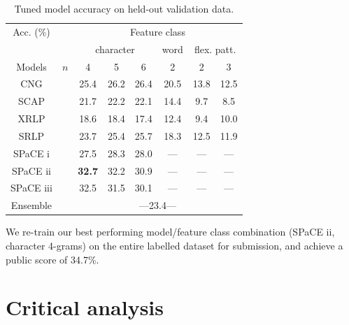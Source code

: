 \documentclass[twocolumn,10pt]{article}
\begin{document}
\begin{table}[h]
\centering
\begin{tabular}{@{}cccccccc@{}}
\cmidrule{3-8}
Acc. (\%)   &     & \multicolumn{6}{c}{Feature class}                    \\
\cmidrule{3-8} 
            &     & \multicolumn{3}{c}{character} & word  & \multicolumn{2}{c}{flex. patt.} \\
\cmidrule(r){1-1} \cmidrule(rl){3-5} \cmidrule(rl){6-6} \cmidrule(rl){7-8} 
Models      & $n$ & 4      & 5      & 6           & 2     & 2     & 3    \\
\cmidrule(r){1-1} \cmidrule{3-8} 
CNG         &     & 25.4   & 26.2   & 26.4        & 20.5  & 13.8  & 12.5 \\
SCAP        &     & 21.7   & 22.2   & 22.1        & 14.4  &  9.7  &  8.5 \\
XRLP        &     & 18.6   & 18.4   & 17.4        & 12.4  &  9.4  & 10.0 \\
SRLP        &     & 23.7   & 25.4   & 25.7        & 18.3  & 12.5  & 11.9 \\
SPaCE i     &     & 27.5   & 28.3   & 28.0        & ---   & ---   & ---  \\
SPaCE ii    & &{\bf 32.7}  & 32.2   & 30.9        & ---   & ---   & ---  \\
SPaCE iii   &     & 32.5   & 31.5   & 30.1        & ---   & ---   & ---  \\
                  \cmidrule{3-8} 
Ensemble    &     & \multicolumn{6}{c}{ ---23.4--- }\\ %
\bottomrule
\end{tabular}
\caption{Tuned model accuracy on held-out validation data.}
\label{tab:devresults}
\end{table}

We re-train our best performing model/feature class combination
(SPaCE ii, character 4-grams) on the entire labelled dataset for submission,
and achieve a public score of 34.7\%.

\section{Critical analysis}
\end{document}
